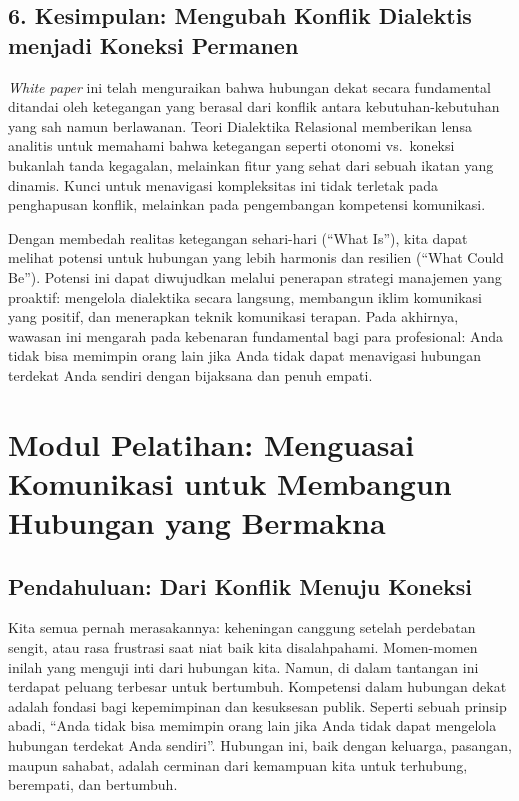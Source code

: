 \documentclass[
  letterpaper,
  DIV=11,
  numbers=noendperiod]{scrreprt}
\begin{document}
\section{\texorpdfstring{\textbf{6. Kesimpulan: Mengubah Konflik
Dialektis menjadi Koneksi
Permanen}}{6. Kesimpulan: Mengubah Konflik Dialektis menjadi Koneksi Permanen}}\label{kesimpulan-mengubah-konflik-dialektis-menjadi-koneksi-permanen}

\emph{White paper} ini telah menguraikan bahwa hubungan dekat secara
fundamental ditandai oleh ketegangan yang berasal dari konflik antara
kebutuhan-kebutuhan yang sah namun berlawanan. Teori Dialektika
Relasional memberikan lensa analitis untuk memahami bahwa ketegangan
seperti otonomi vs.~koneksi bukanlah tanda kegagalan, melainkan fitur
yang sehat dari sebuah ikatan yang dinamis. Kunci untuk menavigasi
kompleksitas ini tidak terletak pada penghapusan konflik, melainkan pada
pengembangan kompetensi komunikasi.

Dengan membedah realitas ketegangan sehari-hari (``What Is''), kita
dapat melihat potensi untuk hubungan yang lebih harmonis dan resilien
(``What Could Be''). Potensi ini dapat diwujudkan melalui penerapan
strategi manajemen yang proaktif: mengelola dialektika secara langsung,
membangun iklim komunikasi yang positif, dan menerapkan teknik
komunikasi terapan. Pada akhirnya, wawasan ini mengarah pada kebenaran
fundamental bagi para profesional: Anda tidak bisa memimpin orang lain
jika Anda tidak dapat menavigasi hubungan terdekat Anda sendiri dengan
bijaksana dan penuh empati.


\chapter{Modul Pelatihan: Menguasai Komunikasi untuk Membangun Hubungan
yang
Bermakna}\label{modul-pelatihan-menguasai-komunikasi-untuk-membangun-hubungan-yang-bermakna}

\section{\texorpdfstring{\textbf{Pendahuluan: Dari Konflik Menuju
Koneksi}}{Pendahuluan: Dari Konflik Menuju Koneksi}}\label{pendahuluan-dari-konflik-menuju-koneksi}

Kita semua pernah merasakannya: keheningan canggung setelah perdebatan
sengit, atau rasa frustrasi saat niat baik kita disalahpahami.
Momen-momen inilah yang menguji inti dari hubungan kita. Namun, di dalam
tantangan ini terdapat peluang terbesar untuk bertumbuh. Kompetensi
dalam hubungan dekat adalah fondasi bagi kepemimpinan dan kesuksesan
publik. Seperti sebuah prinsip abadi, ``Anda tidak bisa memimpin orang
lain jika Anda tidak dapat mengelola hubungan terdekat Anda sendiri''.
Hubungan ini, baik dengan keluarga, pasangan, maupun sahabat, adalah
cerminan dari kemampuan kita untuk terhubung, berempati, dan bertumbuh.
\end{document}
